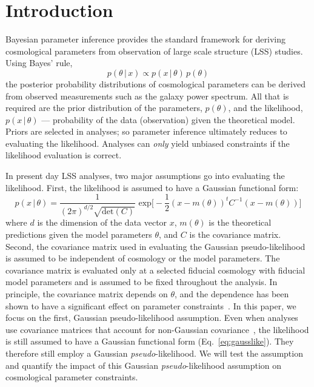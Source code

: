 \documentclass[12pt, letterpaper, preprint]{aastex}
\newcommand{\beq}{\begin{equation}}
\newcommand{\eeq}{\end{equation}}
\newcommand{\lss}{{\small{LSS}}\xspace}
\begin{document}
\section{Introduction}
Bayesian parameter inference provides the standard framework for 
deriving cosmological parameters from observation of large scale 
structure (\lss) studies. %
Using Bayes' rule, 
\beq
p( \theta\,|\,x) \propto p( x\,|\,\theta) \, p(\theta)
\eeq
the posterior probability distributions of cosmological parameters
can be derived from observed measurements such as the galaxy 
power spectrum. All that is required are the prior distribution of the 
parameters, $p(\theta)$, and the likelihood, $p( x\,|\,\theta)$ --- 
probability of the data (observation) given the theoretical model.
Priors are selected in analyses; so parameter inference ultimately 
reduces to evaluating the likelihood. Analyses can {\em only} yield 
unbiased constraints if the likelihood evaluation is correct. 

In present day \lss analyses, two major assumptions go into evaluating the 
likelihood. First, the likelihood is assumed to have a Gaussian functional 
form: 
\beq \label{eq:gausslike}
p(x\,|\,\theta) = \frac{1}{(2\pi)^{d/2} \sqrt{\mathrm{det}(C)}}\,\,\mathrm{exp}\bigg[-\frac{1}{2}(x - m(\theta))^{t} C^{-1} (x - m(\theta))\bigg]
\eeq
where $d$ is the dimension of the data vector $x$, $m(\theta)$ is the
theoretical predictions given the model parameters $\theta$, and $C$ 
is the covariance matrix. Second, the covariance matrix used in evaluating the Gaussian pseudo-likelihood
is assumed to be independent of cosmology or the model parameters.
The covariance matrix is evaluated only at a selected fiducial cosmology with  
fiducial model parameters and is assumed to be fixed throughout  
the analysis. In principle, the covariance matrix depends on $\theta$, 
and the dependence has been shown to have a significant effect 
on parameter constraints~\citep[\emph{e.g.}][]{eifler2009, morrison2013, white2015}. 
In this paper, we focus on the first, Gaussian pseudo-likelihood assumption. 
Even when analyses use covariance matrices that account for non-Gaussian 
covariance~\citep[\emph{e.g.}][]{scoccimarro1999, hu2001, oconnell2016}, 
the likelihood is still assumed to have a Gaussian functional form
(Eq.~\ref{eq:gausslike}). They therefore still employ a Gaussian \emph{pseudo}-likelihood. 
We will test the assumption and quantify the impact of this Gaussian
\emph{pseudo}-likelihood assumption on cosmological parameter constraints. 
\end{document}
